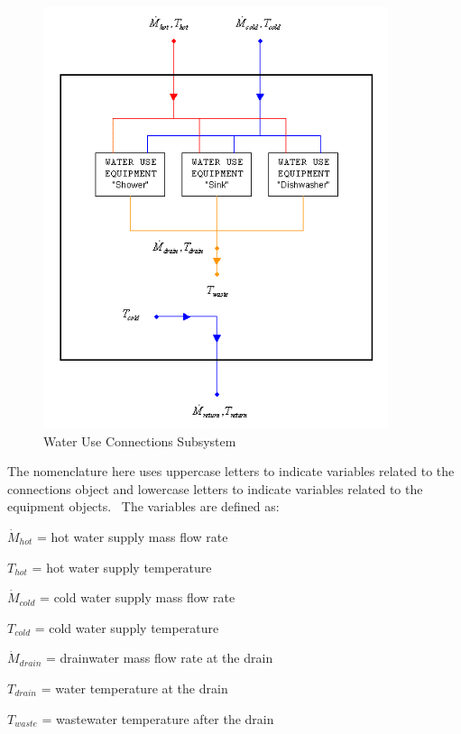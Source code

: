 \begin{figure}[hbtp] %
\centering
\includegraphics[width=0.9\textwidth, height=0.9\textheight, keepaspectratio=true]{media/image7005.png}
\caption{Water Use Connections Subsystem \protect \label{fig:water-use-connections-subsystem}}
\end{figure}

The nomenclature here uses uppercase letters to indicate variables related to the connections object and lowercase letters to indicate variables related to the equipment objects.~ The variables are defined as:

\({\dot M_{hot}}\) = hot water supply mass flow rate

\({T_{hot}}\) = hot water supply temperature

\({\dot M_{cold}}\) = cold water supply mass flow rate

\({T_{cold}}\) = cold water supply temperature

\({\dot M_{drain}}\) = drainwater mass flow rate at the drain

\({T_{drain}}\) = water temperature at the drain

\({T_{waste}}\) = wastewater temperature after the drain

